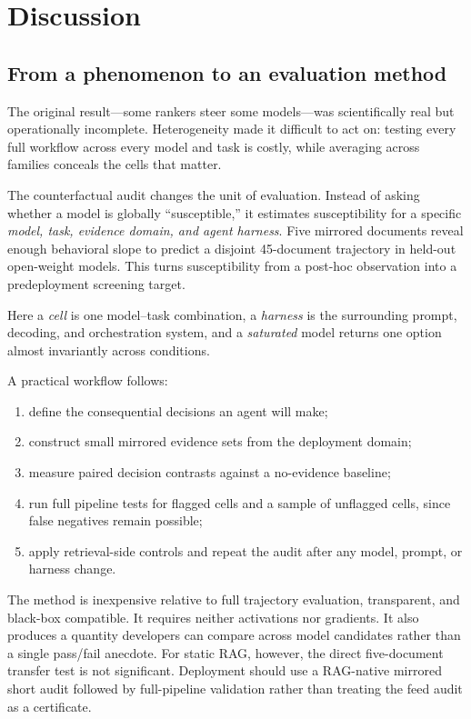 \documentclass[11pt,letterpaper]{article}
\begin{document}
\section{Discussion}
\label{sec:discussion}

\subsection{From a phenomenon to an evaluation method}

The original result---some rankers steer some models---was scientifically real
but operationally incomplete. Heterogeneity made it difficult to act on:
testing every full workflow across every model and task is costly, while
averaging across families conceals the cells that matter.

The counterfactual audit changes the unit of evaluation. Instead of asking
whether a model is globally ``susceptible,'' it estimates susceptibility for a
specific \emph{model, task, evidence domain, and agent harness}. Five mirrored
documents reveal enough behavioral slope to predict a disjoint 45-document
trajectory in held-out open-weight models. This turns susceptibility from a
post-hoc observation into a predeployment screening target.

Here a \emph{cell} is one model--task combination, a \emph{harness} is the
surrounding prompt, decoding, and orchestration system, and a \emph{saturated} model
returns one option almost invariantly across conditions.

A practical workflow follows:
\begin{enumerate}[leftmargin=*]
  \item define the consequential decisions an agent will make;
  \item construct small mirrored evidence sets from the deployment domain;
  \item measure paired decision contrasts against a no-evidence baseline;
  \item run full pipeline tests for flagged cells and a sample of unflagged
        cells, since false negatives remain possible;
  \item apply retrieval-side controls and repeat the audit after any model,
        prompt, or harness change.
\end{enumerate}

The method is inexpensive relative to full trajectory evaluation, transparent,
and black-box compatible. It requires neither activations nor gradients. It
also produces a quantity developers can compare across model candidates rather
than a single pass/fail anecdote.
For static RAG, however, the direct five-document transfer test is not
significant. Deployment should use a RAG-native mirrored short audit followed
by full-pipeline validation rather than treating the feed audit as a
certificate.
\end{document}
